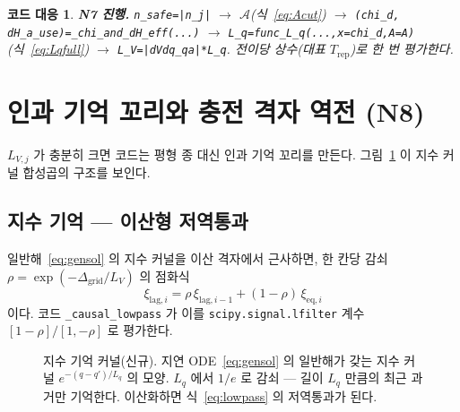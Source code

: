 \documentclass[11pt,a4paper]{article}
\newtheorem*{codebox}{코드 대응}
\newcommand{\eq}{\mathrm{eq}}
\newcommand{\rep}{\mathrm{rep}}
\newcommand{\code}[1]{\texttt{#1}}
\begin{document}
\begin{codebox}
\textbf{N7 진행.} \code{n\_safe=|n\_j|} $\to$ $\mathcal A$(식~\eqref{eq:Acut}) $\to$
\code{(chi\_d, dH\_a\_use)=\_chi\_and\_dH\_eff(...)} $\to$
\code{L\_q=func\_L\_q(...,x=chi\_d,A=A)} (식~\eqref{eq:Lqfull}) $\to$ \code{L\_V=|dVdq\_qa|*L\_q}.
전이당 상수(대표 $T_\rep$)로 한 번 평가한다.
\end{codebox}

\section{인과 기억 꼬리와 충전 격자 역전 (N8)}\label{sec:tail}
$L_{V,j}$ 가 충분히 크면 코드는 평형 종 대신 인과 기억 꼬리를 만든다.
그림~\ref{fig:memorykernel} 이 지수 커널 합성곱의 구조를 보인다.

\subsection{지수 기억 — 이산형 저역통과}
일반해~\eqref{eq:gensol} 의 지수 커널을 이산 격자에서 근사하면, 한 칸당 감쇠
$\rho = \exp(-\Delta_\mathrm{grid}/L_V)$ 의 점화식
\begin{equation}
\xi_{\mathrm{lag},i}=\rho\,\xi_{\mathrm{lag},i-1}+(1-\rho)\,\xi_{\eq,i}
\label{eq:lowpass}
\end{equation}
이다. 코드 \code{\_causal\_lowpass} 가 이를 \code{scipy.signal.lfilter} 계수
$[1-\rho]/[1,-\rho]$ 로 평가한다.

\begin{figure}[t]
\centering
{}
\caption{지수 기억 커널(신규). 지연 ODE~\eqref{eq:gensol} 의 일반해가 갖는 지수 커널
$e^{-(q-q')/L_q}$ 의 모양. $L_q$ 에서 $1/e$ 로 감쇠 — 길이 $L_q$ 만큼의 최근 과거만 기억한다.
이산화하면 식~\eqref{eq:lowpass} 의 저역통과가 된다.}
\label{fig:memorykernel}
\end{figure}
\end{document}
